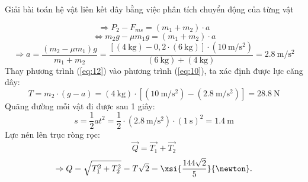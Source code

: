 \begin{dang}{Giải bài toán hệ vật liên kết dây bằng việc phân tích chuyển động của từng vật}
{\begin{enumerate}[label=\alph*)]
$$\Rightarrow P_2-F_{ms}=\left(m_1+m_2\right)\cdot a$$
$$\Leftrightarrow m_2g-\mu m_1g=\left(m_1+m_2\right)\cdot a$$
\begin{equation}
	\label{eq:12}
	\Rightarrow a=\dfrac{\left(m_2-\mu m_1\right)g}{m_1+m_2}=\dfrac{\left[\left(\SI{4}{\kilogram}\right)-0,2\cdot\left(\SI{6}{\kilogram}\right)\right]\cdot\left(\SI{10}{\meter/\second^2}\right)}{\left(\SI{6}{\kilogram}\right)+\left(\SI{4}{\kilogram}\right)}=\SI{2.8}{\meter/\second^2}
\end{equation}
Thay phương trình (\ref{eq:12}) vào phương trình (\ref{eq:10}), ta xác định được lực căng dây:
$$T=m_2\cdot\left(g-a\right)=\left(\SI{4}{\kilogram}\right)\cdot\left[\left(\SI{10}{\meter/\second^2}\right)-\left(\SI{2.8}{\meter/\second^2}\right)\right]=\SI{28.8}{\newton}$$
Quãng đường mỗi vật đi được sau 1 giây:
$$s=\dfrac{1}{2}at^2=\dfrac{1}{2}\cdot\left(\SI{2.8}{\meter/\second^2}\right)\cdot\left(\SI{1}{\second}\right)^2=\SI{1.4}{\meter}$$
Lực nén lên trục ròng rọc:
$$\overrightarrow{Q}=\overrightarrow{T_1}+\overrightarrow{T_2}$$
$$\Rightarrow Q=\sqrt{T^2_1+T^2_2}=T\sqrt{2}=\xsi{\dfrac{144\sqrt{2}}{5}}{\newton}.$$
\end{enumerate}
}
\end{dang}
